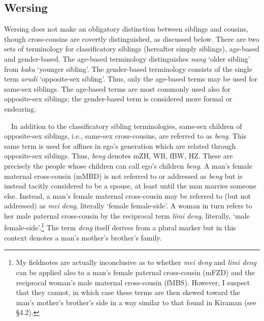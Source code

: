 \subsection[Wersing]{Wersing}
\hypertarget{RefHeading78031871885726}{}Wersing does not make an obligatory distinction between siblings and cousins, though cross-cousins are covertly distinguished, as discussed below. There are two sets of terminology for classificatory siblings (hereafter simply siblings), age-based and gender-based. The age-based terminology distinguishes \textit{nang} {\textquoteleft}older sibling{\textquoteright} from \textit{kaku }{\textquoteleft}younger sibling{\textquoteright}. The gender-based terminology consists of the single term \textit{arudi }{\textquoteleft}opposite-sex sibling{\textquoteright}. Thus, only the age-based terms may be used for same-sex siblings. The age-based terms are most commonly used also for opposite-sex siblings; the gender-based term is considered more formal or endearing.

\ \ In addition to the classificatory sibling terminologies, same-sex children of opposite-sex siblings, i.e., same-sex cross-cousins, are referred to as \textit{beng}. This same term is used for affines in ego{\textquoteright}s generation which are related through opposite-sex siblings. Thus, \textit{beng }denotes mZH, WB, fBW, HZ. These are precisely the people whose children can call ego{\textquoteright}s children \textit{beng}. A man{\textquoteright}s female maternal cross-cousin (mMBD) is not referred to or addressed as \textit{beng }but is instead tacitly considered to be a spouse, at least until the man marries someone else. Instead, a man{\textquoteright}s female maternal cross-cousin may be referred to (but not addressed) as \textit{mei deng}, literally {\textquoteleft}female female-side{\textquoteright}. A woman in turn refers to her male paternal cross-cousin by the reciprocal term \textit{limi deng}, literally, {\textquoteleft}male female-side{\textquoteright}.\footnote{ My fieldnotes are 
actually inconclusive as to whether \textit{mei deng }and \textit{limi deng }can be applied also to a man{\textquoteright}s female paternal cross-cousin (mFZD) and the reciprocal woman{\textquoteright}s male maternal cross-cousin (fMBS). However, I suspect that they cannot, in which case these terms are then skewed toward the man{\textquoteright}s mother{\textquoteright}s brother{\textquoteright}s side in a way similar to that found in Kiraman (see {\S}4.2). } The term \textit{deng} itself derives from a plural marker but in this context denotes a man{\textquoteright}s mother{\textquoteright}s brother{\textquoteright}s family.

